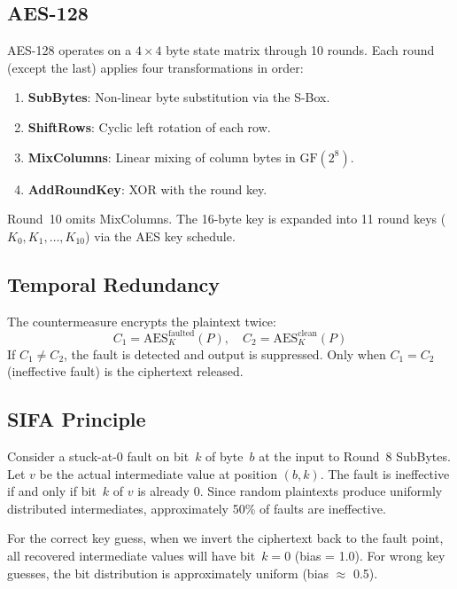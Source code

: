 \documentclass[11pt,a4paper]{article}
\begin{document}
\subsection{AES-128}

AES-128 operates on a $4 \times 4$ byte state matrix through 10 rounds. Each round (except the last) applies four transformations in order:
\begin{enumerate}
    \item \textbf{SubBytes}: Non-linear byte substitution via the S-Box.
    \item \textbf{ShiftRows}: Cyclic left rotation of each row.
    \item \textbf{MixColumns}: Linear mixing of column bytes in $\text{GF}(2^8)$.
    \item \textbf{AddRoundKey}: XOR with the round key.
\end{enumerate}
Round~10 omits MixColumns. The 16-byte key is expanded into 11 round keys ($K_0, K_1, \ldots, K_{10}$) via the AES key schedule.

\subsection{Temporal Redundancy}

The countermeasure encrypts the plaintext twice:
\begin{equation}
    C_1 = \text{AES}_{K}^{\text{faulted}}(P), \quad C_2 = \text{AES}_{K}^{\text{clean}}(P)
\end{equation}
If $C_1 \neq C_2$, the fault is detected and output is suppressed. Only when $C_1 = C_2$ (ineffective fault) is the ciphertext released.

\subsection{SIFA Principle}

Consider a stuck-at-0 fault on bit~$k$ of byte~$b$ at the input to Round~8 SubBytes. Let $v$ be the actual intermediate value at position $(b, k)$. The fault is ineffective if and only if bit~$k$ of $v$ is already 0. Since random plaintexts produce uniformly distributed intermediates, approximately 50\% of faults are ineffective.

For the correct key guess, when we invert the ciphertext back to the fault point, all recovered intermediate values will have bit~$k = 0$ (bias = 1.0). For wrong key guesses, the bit distribution is approximately uniform (bias $\approx$ 0.5).
\end{document}
